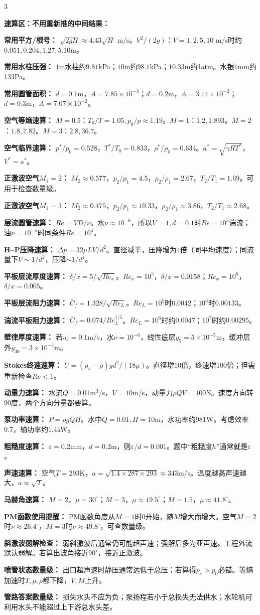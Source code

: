 \documentclass[a4paper]{article}
\newcommand{\sect}[1]{\par{\bfseries\color{Q}#1：}}
\begin{document}
\begin{multicols}{3}
{\sect{速算区：不用重新推的中间结果}
\sect{常用平方/根号}
$\sqrt{2gH}\approx4.43\sqrt{H}$ m/s。$V^2/(2g)$：$V=1,2,5,10$ m/s时约$0.051,0.204,1.27,5.10$m。
\sect{常用水柱压强}
$1$m水柱约$9.81$kPa；$10$m约$98.1$kPa；$10.33$m约1atm。水银$1$mm约133Pa。
\sect{常用圆管面积}
$d=0.1$m，$A=7.85\times10^{-3}$；$d=0.2$m，$A=3.14\times10^{-2}$；$d=0.3$m，$A=7.07\times10^{-2}$。
\sect{空气等熵速算}
$M=0.5$：$T_0/T=1.05,p_0/p\approx1.19$。$M=1$：$1.2,1.893$。$M=2$：$1.8,7.82$。$M=3$：$2.8,36.7$。
\sect{空气临界速算}
$p^*/p_0=0.528$，$T^*/T_0=0.833$，$\rho^*/\rho_0=0.634$。$a^*=\sqrt{\gamma RT^*}$，$V^*=a^*$。
\sect{正激波空气$M_1=2$}
$M_2\approx0.577$，$p_2/p_1=4.5$，$\rho_2/\rho_1=2.67$，$T_2/T_1=1.69$。可用于检查数量级。
\sect{正激波空气$M_1=3$}
$M_2\approx0.475$，$p_2/p_1\approx10.33$，$\rho_2/\rho_1\approx3.86$，$T_2/T_1\approx2.68$。
\sect{层流圆管速算}
$Re=VD/\nu$。水$\nu\approx10^{-6}$，所以$V=1,d=0.1$时$Re=10^5$湍流；油$\nu=10^{-5}$时同条件$Re=10^4$。
\sect{H--P压降速算}
$\Delta p=32\mu LV/d^2$。直径减半，压降增为4倍（同平均速度）；同流量下$V\sim1/d^2$，压降$\sim1/d^4$。
\sect{平板层流厚度速算}
$\delta/x=5/\sqrt{Re_x}$。$Re_x=10^5$，$\delta/x=0.0158$；$Re_x=10^6$，$\delta/x=0.005$。
\sect{平板层流阻力速算}
$\bar C_f=1.328/\sqrt{Re_L}$。$Re_L=10^5$时$0.0042$；$10^6$时$0.00133$。
\sect{湍流平板阻力速算}
$\bar C_f=0.074/Re_L^{1/5}$。$Re_L=10^6$时约$0.0047$；$10^7$时约$0.00295$。
\sect{壁律厚度速算}
若$u_\tau=0.1$m/s，水$\nu=10^{-6}$，线性底层$y_5=5\times10^{-5}$m，缓冲层外$y_{30}=3\times10^{-4}$m。
\sect{Stokes终速速算}
$U=(\rho_s-\rho)gd^2/(18\mu)$。直径增10倍，终速增100倍；但需重新检查$Re<1$。
\sect{动量力速算}
水流$Q=0.01$m$^3$/s，$V=10$m/s，动量力$\rho QV=100$N。速度方向转90度，两个方向分量都要算。
\sect{泵功率速算}
$P=\rho gQH$。水中$Q=0.01,H=10$m，水功率约981W。考虑效率0.7，轴功率约1.4kW。
\sect{粗糙度速算}
$\varepsilon=0.2$mm，$d=0.2$m，则$\varepsilon/d=0.001$。题中“粗糙度$h$”通常就是$\varepsilon$。
\sect{声速速算}
空气$T=293$K，$a=\sqrt{1.4\times287\times293}\approx343$m/s。温度越高声速越大，$a\propto\sqrt T$。
\sect{马赫角速算}
$M=2$，$\mu=30^\circ$；$M=3$，$\mu\approx19.5^\circ$；$M=1.5$，$\mu\approx41.8^\circ$。
\sect{PM函数使用提醒}
PM函数角度从$M=1$时0开始，随$M$增大而增大。空气$M=2$时$\nu\approx26.4^\circ$，$M=3$时$\nu\approx49.8^\circ$，可查数量级。
\sect{斜激波弱解检查}
弱斜激波后通常仍可能超声速；强解后多为亚声速。工程外流默认弱解。若算出波角接近$90^\circ$，接近正激波。
\sect{喷管状态数量级}
出口超声速时静压通常远低于总压；若算得$p_e>p_0$必错。等熵加速时$T,p,\rho$都下降，$V,M$上升。
\sect{管路答案数量级}
损失水头不应为负；泵扬程若小于总损失无法供水；水轮机可利用水头不能超过上下游总水头差。
}
\end{multicols}
\end{document}
